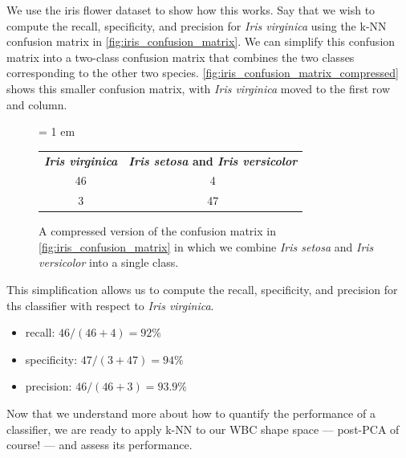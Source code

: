 We use the iris flower dataset to show how this works. Say that we wish to compute the recall, specificity, and precision for \textit{Iris virginica} using the k-NN confusion matrix in \autoref{fig:iris_confusion_matrix}. We can simplify this confusion matrix into a two-class confusion matrix that combines the two classes corresponding to the other two species. \autoref{fig:iris_confusion_matrix_compressed}
 shows this smaller confusion matrix, with \textit{Iris virginica} moved to the first row and column.\\

 \begin{figure}[h]
\centering
\tabcolsep = 1 em
\mySfFamily
\begin{tabular}{c c}
\textbf{\textit{Iris virginica}} & \textbf{\textit{Iris setosa} and \textit{Iris versicolor}} \\
46 & 4 \\
3 & 47 \\
\end{tabular}
\caption{A compressed version of the confusion matrix in \autoref{fig:iris_confusion_matrix} in which we combine \textit{Iris setosa} and \textit{Iris versicolor} into a single class.}
\label{fig:iris_confusion_matrix_compressed}
\end{figure}

This simplification allows us to compute the recall, specificity, and precision for ths classifier with respect to \textit{Iris virginica}.

\begin{itemize}
\item recall: $46/(46+4) = 92\%$
\item specificity: $47/(3+47) = 94\%$
\item precision: $46/(46+3) = 93.9\%$
\end{itemize}

\fudgespace

\begin{qbox}\end{qbox}

Now that we understand more about how to quantify the performance of a classifier, we are ready to apply k-NN to our WBC shape space --- post-PCA of course! --- and assess its performance.

\FloatBarrier
{}
